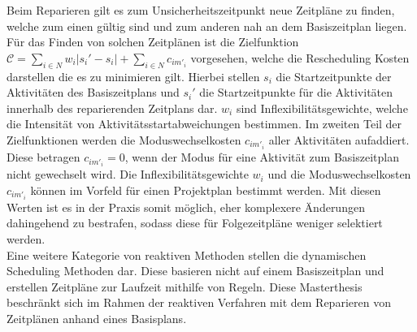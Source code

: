 Beim Reparieren gilt es zum Unsicherheitszeitpunkt neue Zeitpläne zu finden, welche zum einen gültig sind und zum anderen nah an dem Basiszeitplan liegen. Für das Finden von solchen Zeitplänen ist die Zielfunktion $\mathcal{C} = \sum_{i \in N} w_i | s_i' - s_i| + \sum_{i \in N} c_{im'_i}$ vorgesehen, welche die Rescheduling Kosten darstellen die es zu minimieren gilt. Hierbei stellen $s_i$ die Startzeitpunkte der Aktivitäten des Basiszeitplans und $s_i'$ die Startzeitpunkte für die Aktivitäten innerhalb des reparierenden Zeitplans dar. $w_i$ sind Inflexibilitätsgewichte, welche die Intensität von Aktivitätsstartabweichungen bestimmen. Im zweiten Teil der Zielfunktionen werden die Moduswechselkosten $c_{im'_i}$ aller Aktivitäten aufaddiert. Diese betragen $c_{im'_i} = 0$, wenn der Modus für eine Aktivität zum Basiszeitplan nicht gewechselt wird. Die Inflexibilitätsgewichte $w_i$ und die Moduswechselkosten $c_{im'_i}$ können im Vorfeld für einen Projektplan bestimmt werden. Mit diesen Werten ist es in der Praxis somit möglich, eher komplexere Änderungen dahingehend zu bestrafen, sodass diese für Folgezeitpläne weniger selektiert werden. \cite[vgl.][S. 5 f.]{deblaere_exact_2008}\\


Eine weitere Kategorie von reaktiven Methoden stellen die dynamischen Scheduling Methoden dar. Diese basieren nicht auf einem Basiszeitplan und erstellen Zeitpläne zur Laufzeit mithilfe von Regeln. \cite[S. 404]{brcic_resource_2012} Diese Masterthesis beschränkt sich im Rahmen der reaktiven Verfahren mit dem Reparieren von Zeitplänen anhand eines Basisplans. 